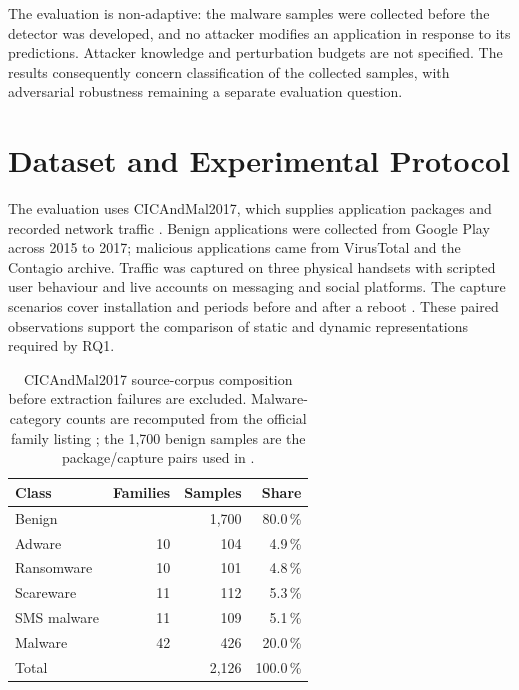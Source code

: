 The evaluation is non-adaptive: the malware samples were collected before the detector was
developed, and no attacker modifies an application in response to its predictions. Attacker
knowledge and perturbation budgets are not specified. The results consequently concern
classification of the collected samples, with adversarial robustness remaining a separate
evaluation question.

\section{Dataset and Experimental Protocol}
\label{sec:hybroid:4}

The evaluation uses CICAndMal2017, which supplies application packages and recorded network
traffic \cite{lashkari2018toward}. Benign applications were collected from Google Play across
2015 to 2017; malicious applications came from VirusTotal and the Contagio archive. Traffic
was captured on three physical handsets with scripted user behaviour and live accounts on
messaging and social platforms. The capture scenarios cover installation and periods before
and after a reboot \cite{cicandmal2017dataset}. These paired observations support the
comparison of static and dynamic representations required by RQ1.

\begin{table}
  \caption{CICAndMal2017 source-corpus composition before extraction failures are excluded.
  Malware-category counts are recomputed from the official family listing
  \cite{cicandmal2017dataset}; the 1,700 benign samples are the package/capture pairs used in
  \cite{norouzian2021hybroid}.}
  \label{tab:hybroid:dataset}
  \centering
  \begin{tabular}{lrrr}
    \toprule
    Class & Families & Samples & Share \\
    \midrule
    Benign        &     & 1,700 & 80.0\,\% \\
    \midrule
    Adware        & 10  &   104 &  4.9\,\% \\
    Ransomware    & 10  &   101 &  4.8\,\% \\
    Scareware     & 11  &   112 &  5.3\,\% \\
    SMS malware   & 11  &   109 &  5.1\,\% \\
    \midrule
    Malware       & 42  &   426 & 20.0\,\% \\
    Total         &     & 2,126 & 100.0\,\% \\
    \bottomrule
  \end{tabular}
\end{table}

